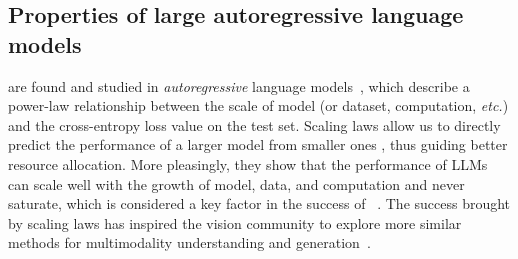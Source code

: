 \vspace{-2pt}
\subsection{Properties of large autoregressive language models}
\vspace{-2pt}

 are found and studied in \textit{autoregressive} language models~\cite{scalinglaw,scalingar}, which describe a power-law relationship between the scale of model (or dataset, computation, \textit{etc.}) and the cross-entropy loss value on the test set.
Scaling laws allow us to directly predict the performance of a larger model from smaller ones \cite{gpt4}, thus guiding better resource allocation.
More pleasingly, they show that the performance of LLMs can scale well with the growth of model, data, and computation and never saturate, which is considered a key factor in the success of ~\cite{gpt3, llama1, llama2, opt, bloom, chinchilla}.
The success brought by scaling laws has inspired the vision community to explore more similar methods for multimodality understanding and generation~\cite{llava,alayrac2022flamingo,visionllm,dong2023dreamllm,cm3leon_chameleon,emu_baai,chen2023internvl,dai2023emu_meta,jin2023unified,ge2023seed_llama,ge2024seedx,tian2024mminterleaved,wang2024git}.







